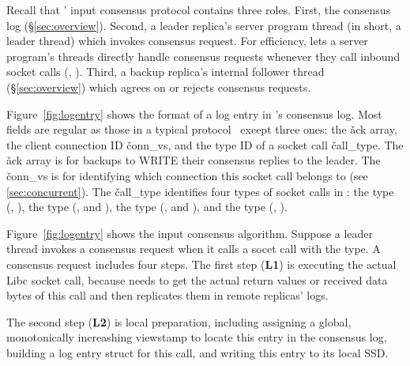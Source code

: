 
Recall that \xxx' input consensus protocol contains three roles. First, the 
\paxos consensus log (\S\ref{sec:overview}). Second, a leader replica's server 
program thread (in short, a leader thread) which invokes consensus request. For 
efficiency, \xxx lets a server program's threads directly handle consensus 
requests whenever they call inbound socket calls (\eg, \recv). Third, a backup 
replica's \xxx internal follower thread (\S\ref{sec:overview}) which agrees on 
or rejects consensus requests.

Figure~\ref{fig:logentry} shows the format of a log entry in \xxx's consensus 
log. Most fields are regular as those in a typical \paxos 
protocol~\cite{paxos:practical} except three ones: the \v{ack} array, the 
client connection ID \v{conn\_vs}, and the type ID of a socket call 
\v{call\_type}. The \v{ack} array is for backups to WRITE their consensus 
replies to the leader. The \v{conn\_vs} is for identifying which connection this 
socket call belongs to (see \ref{sec:concurrent}). The \v{call\_type} 
identifies four types of socket calls in \xxx: the \accept type (\eg, \accept), 
the \recv type (\eg, \recv and \myread), the \send type (\eg, \send and 
\mywrite), and the \close type (\eg, \close).

Figure~\ref{fig:logentry} shows the input consensus algorithm. Suppose a leader 
thread invokes a consensus request when it calls a socet call with the \recv 
type. A consensus request includes four steps. The first step (\textbf{L1}) is 
executing the actual Libc socket call, because \xxx needs to get the actual 
return values or received data bytes of this call and then replicates them in 
remote replicas' logs.

The second step (\textbf{L2}) is local preparation, including assigning a 
global, monotonically increashing viewstamp to locate this entry in the 
consensus log, building a log entry struct for this call, and writing this 
entry to its local SSD.

